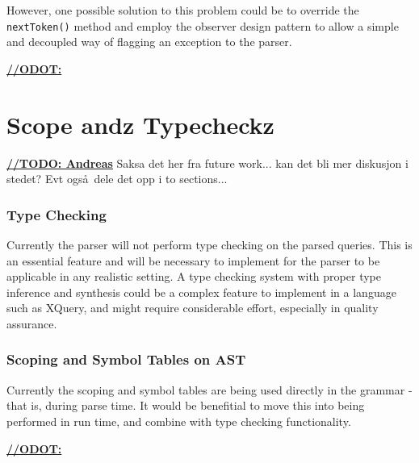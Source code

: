 However, one possible solution to this problem could be to override the \verb!nextToken()! method and employ the observer design pattern to allow a simple and decoupled way of flagging an exception to the parser.



\underline{\textbf{\LARGE //ODOT:}}


\section{Scope andz Typecheckz}

\underline{\textbf{\LARGE //TODO: Andreas}} Saksa det her fra future work... kan det bli mer diskusjon i stedet? Evt ogs\aa~dele det opp i to sections...

\subsubsection{Type Checking}
Currently the parser will not perform type checking on the parsed queries. This
is an essential feature and will be necessary to implement for the parser to be
applicable in any realistic setting. A type checking system with proper type
inference and synthesis could be a complex feature to implement in a language
such as XQuery, and might require considerable effort, especially in quality
assurance. 

\subsubsection{Scoping and Symbol Tables on AST}
Currently the scoping and symbol tables are being used directly in the grammar -
that is, during parse time. It would be benefitial to move this into being
performed in run time, and combine with type checking functionality.

\underline{\textbf{\LARGE //ODOT:}}